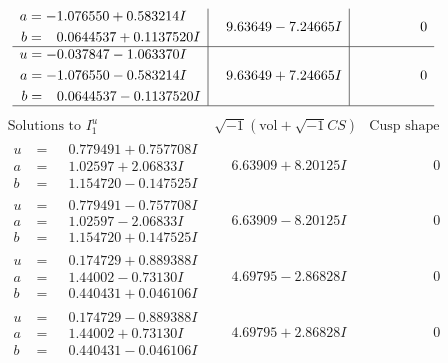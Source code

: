 \documentclass[1p]{elsarticle_modified}
\theoremstyle{definition}
\newcommand{\I}{\sqrt{-1}}
\begin{document}
$$\begin{array}{c|c|c}
\begin{aligned}
a &= -1.076550 + 0.583214 I \\
b &= \phantom{-}0.0644537 + 0.1137520 I\end{aligned}
 & \phantom{-}9.63649 - 7.24665 I & \phantom{-0.000000 } 0 \\ \hline\begin{aligned}
u &= -0.037847 - 1.063370 I \\
a &= -1.076550 - 0.583214 I \\
b &= \phantom{-}0.0644537 - 0.1137520 I\end{aligned}
 & \phantom{-}9.63649 + 7.24665 I & \phantom{-0.000000 } 0\\
 \hline 
 \end{array}$$\newpage$$\begin{array}{c|c|c}  
\text{Solutions to }I^u_{1}& \I (\text{vol} + \sqrt{-1}CS) & \text{Cusp shape}\\
 \hline 
\begin{aligned}
u &= \phantom{-}0.779491 + 0.757708 I \\
a &= \phantom{-}1.02597 + 2.06833 I \\
b &= \phantom{-}1.154720 - 0.147525 I\end{aligned}
 & \phantom{-}6.63909 + 8.20125 I & \phantom{-0.000000 } 0 \\ \hline\begin{aligned}
u &= \phantom{-}0.779491 - 0.757708 I \\
a &= \phantom{-}1.02597 - 2.06833 I \\
b &= \phantom{-}1.154720 + 0.147525 I\end{aligned}
 & \phantom{-}6.63909 - 8.20125 I & \phantom{-0.000000 } 0 \\ \hline\begin{aligned}
u &= \phantom{-}0.174729 + 0.889388 I \\
a &= \phantom{-}1.44002 - 0.73130 I \\
b &= \phantom{-}0.440431 + 0.046106 I\end{aligned}
 & \phantom{-}4.69795 - 2.86828 I & \phantom{-0.000000 } 0 \\ \hline\begin{aligned}
u &= \phantom{-}0.174729 - 0.889388 I \\
a &= \phantom{-}1.44002 + 0.73130 I \\
b &= \phantom{-}0.440431 - 0.046106 I\end{aligned}
 & \phantom{-}4.69795 + 2.86828 I & \phantom{-0.000000 } 0 \\ \hline\begin{aligned}

\end{aligned}
\end{array}$$
\end{document}
